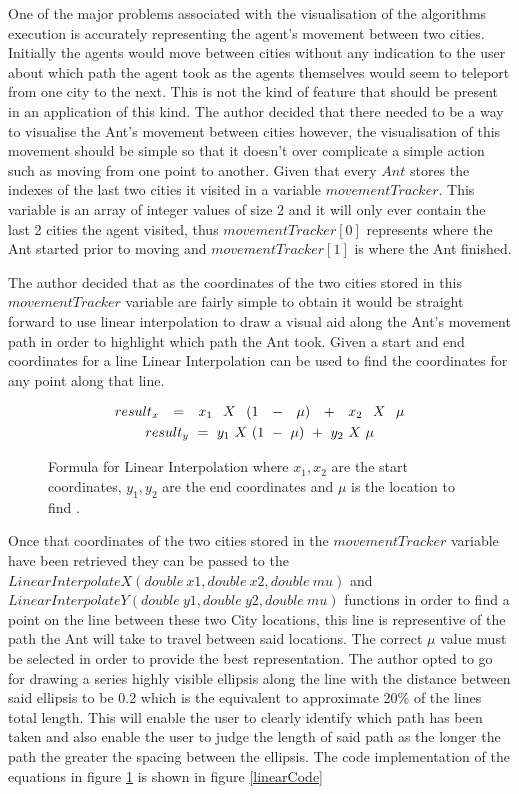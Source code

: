 One of the major problems associated with the visualisation of the algorithms execution is accurately representing the agent’s movement between two cities. Initially the agents would move between cities without any indication to the user about which path the agent took as the agents themselves would seem to teleport from one city to the next. This is not the kind of feature that should be present in an application of this kind. The author decided that there needed to be a way to visualise the Ant’s movement between cities however, the visualisation of this movement should be simple so that it doesn’t over complicate a simple action such as moving from one point to another. Given that every $Ant$ stores the indexes of the last two cities it visited in a variable $movementTracker$. This variable is an array of integer values of size 2 and it will only ever contain the last 2 cities the agent visited, thus $movementTracker[0]$ represents where the Ant started prior to moving and $movementTracker[1]$ is where the Ant finished.

The author decided that as the coordinates of the two cities stored in this $movementTracker$ variable are fairly simple to obtain it would be straight forward to use linear interpolation to draw a visual aid along the Ant's movement path in order to highlight which path the Ant took. Given a start and end coordinates for a line Linear Interpolation can be used to find the coordinates for any point along that line. 

\begin{figure}[H]
\centering
\begin{gather*}
\Huge
result_x\ =\ x_1\ X\ (1\ -\ \mu)\ +\ x_2\ X\ \mu \\
result_y\ =\ y_1\ X\ (1\ -\ \mu)\ +\ y_2\ X\ \mu
\end{gather*}
\caption{Formula for Linear Interpolation where $x_1, x_2$ are the start coordinates, $y_1, y_2$ are the end coordinates and $\mu$ is the location to find \cite{interpolation:site}.}
\label{fig:interPolateEqn}
\end{figure}

Once that coordinates of the two cities stored in the $movementTracker$ variable have been retrieved they can be passed to the $LinearInterpolateX(double\ x1, double\ x2, double\ mu)$ and $LinearInterpolateY(double\ y1, double\ y2, double\ mu)$ functions in order to find a point on the line between these two City locations, this line is representive of the path the Ant will take to travel between said locations. The correct $\mu$ value must be selected in order to provide the best representation. The author opted to go for drawing a series highly visible ellipsis along the line with the distance between said ellipsis to be 0.2 which is the equivalent to approximate 20\% of the lines total length. This will enable the user to clearly identify which path has been taken and also enable the user to judge the length of said path as the longer the path the greater the spacing between the ellipsis. The code implementation of the equations in figure \ref{fig:interPolateEqn} is shown in figure \ref{linearCode}

